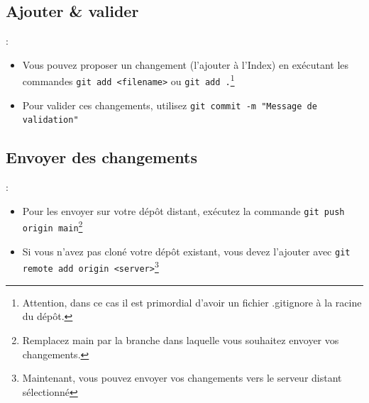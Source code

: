 \documentclass[10pt]{beamer}
\begin{document}
\subsection{Ajouter \& valider}
\begin{frame}{\secname : \subsecname}
    \begin{itemize}
        \item Vous pouvez proposer un changement (l'ajouter à l'Index) en exécutant les commandes
              \lstinline[language=git]!git add <filename>! ou
              \lstinline[language=git]!git add .!\footnote{Attention, dans ce cas il est primordial d'avoir un fichier .gitignore à la racine du dépôt.}
        \item Pour valider ces changements, utilisez
              \lstinline[language=git]!git commit -m "Message de validation"!
    \end{itemize}
\end{frame}

\subsection{Envoyer des changements}
\begin{frame}{\secname : \subsecname}
    \begin{itemize}
        \item Pour les envoyer sur votre dépôt distant, exécutez la commande
              \lstinline[language=git]!git push origin main!\footnote{Remplacez main par la branche dans laquelle vous souhaitez envoyer vos changements. }
        \item Si vous n'avez pas cloné votre dépôt existant, vous devez l'ajouter avec
              \lstinline[language=git]!git remote add origin <server>!\footnote{Maintenant, vous pouvez envoyer vos changements vers le serveur distant sélectionné}
    \end{itemize}
\end{frame}
\end{document}
